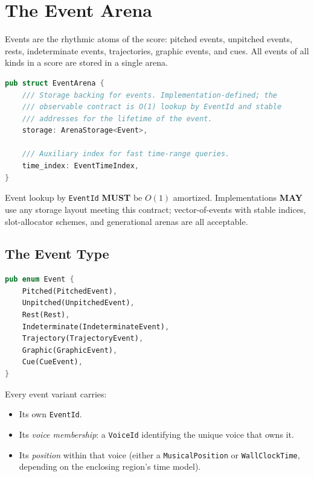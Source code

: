 \documentclass[11pt,letterpaper]{report}
\newcounter{requirement}[chapter]
\newcommand{\MUST}{\textbf{MUST}}
\newcommand{\MAY}{\textbf{MAY}}
\begin{document}
\section{The Event Arena}
\label{sec:graph:arena}

Events are the rhythmic atoms of the score: pitched events, unpitched
events, rests, indeterminate events, trajectories, graphic events,
and cues. All events of all kinds in a score are stored in a single
arena.

\begin{lstlisting}[language=Rust]
pub struct EventArena {
    /// Storage backing for events. Implementation-defined; the
    /// observable contract is O(1) lookup by EventId and stable
    /// addresses for the lifetime of the event.
    storage: ArenaStorage<Event>,

    /// Auxiliary index for fast time-range queries.
    time_index: EventTimeIndex,
}
\end{lstlisting}

\begin{requirement}
  \label{req:graph:constant-time-event-lookup}
  Event lookup by \texttt{EventId} \MUST{} be $O(1)$ amortized.
  Implementations \MAY{} use any storage layout meeting this contract;
  vector-of-events with stable indices, slot-allocator schemes, and
  generational arenas are all acceptable.
\end{requirement}

\subsection{The Event Type}

\begin{lstlisting}[language=Rust]
pub enum Event {
    Pitched(PitchedEvent),
    Unpitched(UnpitchedEvent),
    Rest(Rest),
    Indeterminate(IndeterminateEvent),
    Trajectory(TrajectoryEvent),
    Graphic(GraphicEvent),
    Cue(CueEvent),
}
\end{lstlisting}

Every event variant carries:

\begin{itemize}
  \item Its own \texttt{EventId}.
  \item Its \emph{voice membership}: a \texttt{VoiceId} identifying
    the unique voice that owns it.
  \item Its \emph{position} within that voice (either a
    \texttt{MusicalPosition} or \texttt{WallClockTime}, depending on
    the enclosing region's time model).
\end{itemize}
\end{document}
